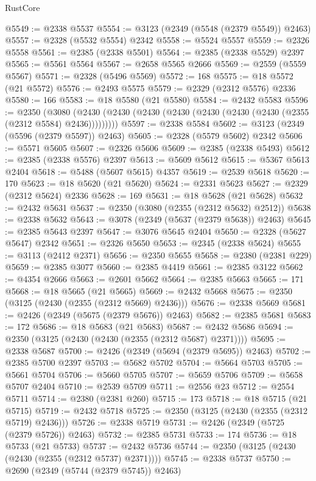 \begin{lexlean}{RustCore}
\begin{coremodule}
@5549 := @2338 @5537
@5554 := @3123 (@2349 (@5548 (@2379 @5549)) @2463)
@5557 := @2328 (@5532 @5554) @2342
@5558 := @5524 @5557
@5559 := @2326 @5558
@5561 := @2385 (@2338 @5501)
@5564 := @2385 (@2338 @5529) @2397
@5565 := @5561 @5564
@5567 := @2658 @5565 @2666
@5569 := @2559 (@5559 @5567)
@5571 := @2328 (@5496 @5569)
@5572 := 168
@5575 := @18 @5572 (@21 @5572)
@5576 := @2493 @5575
@5579 := @2329 (@2312 @5576) @2336
@5580 := 166
@5583 := @18 @5580 (@21 @5580)
@5584 := @2432 @5583
@5596 := @2350
    (@3080 (@2430 (@2430 (@2430 (@2430 (@2430 (@2430 (@2430 (@2355 (@2312 @5584) @2436)))))))))
@5597 := @2338 @5584
@5602 := @3123 (@2349 (@5596 (@2379 @5597)) @2463)
@5605 := @2328 (@5579 @5602) @2342
@5606 := @5571 @5605
@5607 := @2326 @5606
@5609 := @2385 (@2338 @5493)
@5612 := @2385 (@2338 @5576) @2397
@5613 := @5609 @5612
@5615 := @5367 @5613 @2404
@5618 := @5488 (@5607 @5615) @4357
@5619 := @2539 @5618
@5620 := 170
@5623 := @18 @5620 (@21 @5620)
@5624 := @2331 @5623
@5627 := @2329 (@2312 @5624) @2336
@5628 := 169
@5631 := @18 @5628 (@21 @5628)
@5632 := @2432 @5631
@5637 := @2350 (@3080 (@2355 (@2312 @5632) @2512))
@5638 := @2338 @5632
@5643 := @3078 (@2349 (@5637 (@2379 @5638)) @2463)
@5645 := @2385 @5643 @2397
@5647 := @3076 @5645 @2404
@5650 := @2328 (@5627 @5647) @2342
@5651 := @2326 @5650
@5653 := @2345 (@2338 @5624)
@5655 := @3113 (@2412 @2371)
@5656 := @2350 @5655
@5658 := @2380 (@2381 @229)
@5659 := @2385 @3077
@5660 := @2385 @4419
@5661 := @2385 @3122
@5662 := @4354 @2666
@5663 := @2601 @5662
@5664 := @2385 @5663
@5665 := 171
@5668 := @18 @5665 (@21 @5665)
@5669 := @2432 @5668
@5675 := @2350 (@3125 (@2430 (@2355 (@2312 @5669) @2436)))
@5676 := @2338 @5669
@5681 := @2426 (@2349 (@5675 (@2379 @5676)) @2463)
@5682 := @2385 @5681
@5683 := 172
@5686 := @18 @5683 (@21 @5683)
@5687 := @2432 @5686
@5694 := @2350 (@3125 (@2430 (@2430 (@2355 (@2312 @5687) @2371))))
@5695 := @2338 @5687
@5700 := @2426 (@2349 (@5694 (@2379 @5695)) @2463)
@5702 := @2385 @5700 @2397
@5703 := @5682 @5702
@5704 := @5664 @5703
@5705 := @5661 @5704
@5706 := @5660 @5705
@5707 := @5659 @5706
@5709 := @5658 @5707 @2404
@5710 := @2539 @5709
@5711 := @2556 @23
@5712 := @2554 @5711
@5714 := @2380 (@2381 @260)
@5715 := 173
@5718 := @18 @5715 (@21 @5715)
@5719 := @2432 @5718
@5725 := @2350 (@3125 (@2430 (@2355 (@2312 @5719) @2436)))
@5726 := @2338 @5719
@5731 := @2426 (@2349 (@5725 (@2379 @5726)) @2463)
@5732 := @2385 @5731
@5733 := 174
@5736 := @18 @5733 (@21 @5733)
@5737 := @2432 @5736
@5744 := @2350 (@3125 (@2430 (@2430 (@2355 (@2312 @5737) @2371))))
@5745 := @2338 @5737
@5750 := @2690 (@2349 (@5744 (@2379 @5745)) @2463)

\end{coremodule}
\end{lexlean}
